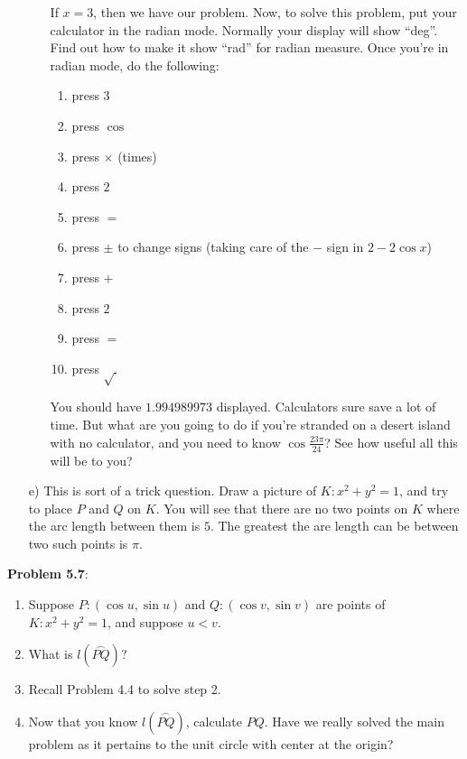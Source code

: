 \documentclass[english]{book}
\newcommand{\arc}[1]{\overset{\frown}{#1} }
\begin{document}
\begin{enumerate}
\begin{enumerate}[\hspace{1cm}1)]
          If $x=3$, then we have our problem. Now, to solve this problem, put your calculator in the radian mode. Normally your display will show ``deg''. Find out how to make it show ``rad'' for radian measure. Once you're in radian mode, do the following:
        \begin{enumerate}[\hspace{1cm}1.]
          \item press $3$
          \item press $\cos$
          \item press $\times$ (times)
          \item press $2$
          \item press $=$
          \item press $\pm$ to change signs (taking care of the $-$ sign in $2-2 \cos x$)
          \item press $+$
          \item press $2$
          \item press $=$
          \item press $\sqrt{\ }$
        \end{enumerate}
        You should have $1.994989973$ displayed. Calculators sure save a lot of time. But what are you going to do if you're stranded on a desert island with no calculator, and you need to know $\cos \frac{23\pi}{24}$? See how useful all this will be to you?
    \end{enumerate}

  \item[\hspace{1cm}e)] This is sort of a trick question. Draw a picture of $K:x^{2}+y^{2}=1$, and try to place $P$ and $Q$ on $K$. You will see that there are no two points on $K$ where the arc length between them is $5$. The greatest the are length can be between two such points is $\pi$.
\end{enumerate}


\textbf{Problem 5.7}:
\begin{enumerate}[\hspace{1cm}1)]
  \item Suppose $P:(\cos u, \sin u)$ and $Q:(\cos v, \sin v)$ are points of $K:x^{2}+y^{2}=1$, and suppose $u < v$.
  \item What is $l(\arc{PQ})$?
  \item Recall Problem 4.4 to solve step 2.
  \item Now that you know $l(\arc{PQ})$, calculate $PQ$. Have we really solved the main problem as it pertains to the unit circle with center at the origin?
\end{enumerate}
\end{document}
